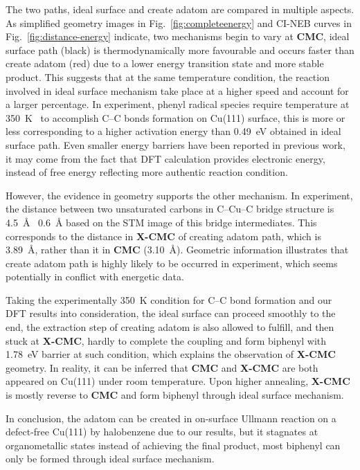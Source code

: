 \documentclass[%
 reprint,
 amsmath,amssymb,
 aps,
prb,
floatfix,
]{revtex4-2}
\newcommand{\zhzh}{\color{blue}}
\newcommand{\zhzh}{\color{blue}}
\begin{document}
{\zhzh

The two paths, ideal surface and create adatom are compared in multiple aspects.
As simplified geometry images in Fig.~\ref{fig:completeenergy} and CI-NEB curves in Fig.~\ref{fig:distance-energy} indicate, two mechanisms begin to vary at \textbf{CMC}, ideal surface path (black) is thermodynamically more favourable and occurs faster than create adatom (red) due to a lower energy transition state and more stable product. This suggests that at the same temperature condition, the reaction involved in ideal surface mechanism take place at a higher speed and account for a larger percentage. In experiment, phenyl radical species require temperature at \SI{350}{\kelvin}~\cite{sur_sci01}  to accomplish C--C bonds formation on Cu(111) surface, this is more or less corresponding to a higher activation energy than \SI{0.49}{\electronvolt} obtained in ideal surface path. Even smaller energy barriers have been reported in previous work\cite{pccp2010, jacs2013}, it may come from the fact that DFT calculation provides electronic energy, instead of free energy reflecting more authentic reaction condition.

However, the evidence in geometry supports the other mechanism. In experiment, the distance between two unsaturated carbons in C--Cu--C bridge structure is \SI{4.5}{\angstrom} \textpm\ \SI{0.6}{\angstrom} based on the STM image of this bridge intermediates. This corresponds to the distance in \textbf{X-CMC} of creating adatom path, which is \SI{3.89}{\angstrom}, rather than it in \textbf{CMC} (\SI{3.10}{\angstrom}). Geometric information illustrates that create adatom path is highly likely to be occurred in experiment, which seems potentially in conflict with energetic data.

Taking the experimentally \SI{350}{\kelvin} condition for C--C bond formation and our DFT results into consideration, the ideal surface can proceed smoothly to the end, the extraction step of creating adatom is also allowed to fulfill, and then stuck at \textbf{X-CMC}, hardly to complete the coupling and form biphenyl with \SI{1.78}{\electronvolt} barrier at such condition, which explains the observation of \textbf{X-CMC} geometry. In reality, it can be inferred that \textbf{CMC} and \textbf{X-CMC} are both appeared on Cu(111) under room temperature. Upon higher annealing, \textbf{X-CMC} is mostly reverse to \textbf{CMC} and form biphenyl through ideal surface mechanism. 

In conclusion, the adatom can be created in on-surface Ullmann reaction on a defect-free Cu(111) by halobenzene due to our results, but it stagnates at organometallic states instead of achieving the final product, most biphenyl can only be formed through ideal surface mechanism.

}
\fi
\end{document}
